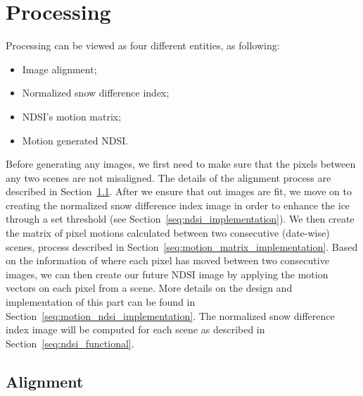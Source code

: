 \documentclass[12pt, a4paper]{report}
\begin{document}

	\section{Processing}
	\label{seq:processing}
	
	\par Processing can be viewed as four different entities, as following:
	
	\begin{itemize}
		\item Image alignment;
		\item Normalized snow difference index;
		\item NDSI's motion matrix;
		\item Motion generated NDSI.
	\end{itemize}

	\par Before generating any images, we first need to make sure that the pixels between any two scenes are not misaligned. The details of the alignment process are described in Section~\ref{seq:alignment_implementation}. After we ensure that out images are fit, we move on to creating the normalized snow difference index image in order to enhance the ice through a set threshold (see Section~\ref{seq:ndsi_implementation}). We then create the matrix of pixel motions calculated between two consecutive (date-wise) scenes, process described in Section~\ref{seq:motion_matrix_implementation}. Based on the information of where each pixel has moved between two consecutive images, we can then create our future NDSI image by applying the motion vectors on each pixel from a scene. More details on the design and implementation of this part can be found in Section~\ref{seq:motion_ndsi_implementation}.
	The normalized snow difference index image will be computed for each scene as described in Section~\ref{seq:ndsi_functional}.
	
	
	\subsection{Alignment}
	\label{seq:alignment_implementation}\
	
\end{document}
